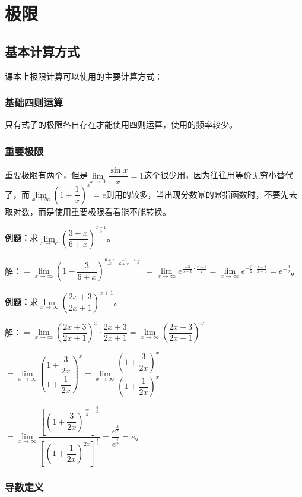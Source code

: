 \chapter{极限}
\section{基本计算方式}

课本上极限计算可以使用的主要计算方式：

\subsection{基础四则运算}

只有式子的极限各自存在才能使用四则运算，使用的频率较少。

\subsection{重要极限}

重要极限有两个，但是$\lim\limits_{x\to 0}\dfrac{\sin x}{x}=1$这个很少用，因为往往用等价无穷小替代了，而$\lim\limits_{x\to\infty}\left(1+\dfrac{1}{x}\right)^x=e$则用的较多，当出现分数幂的幂指函数时，不要先去取对数，而是使用重要极限看看能不能转换。\medskip

\textbf{例题：}求$\lim\limits_{x\to\infty}\left(\dfrac{3+x}{6+x}\right)^{\frac{x-1}{2}}$。\medskip

解：$=\lim\limits_{x\to\infty}\left(1-\dfrac{3}{6+x}\right)^{\frac{6+x}{-3}\cdot\frac{-3}{6+x}\cdot\frac{x-1}{2}}=\lim\limits_{x\to\infty}e^{\frac{-3}{6+x}\cdot\frac{x-1}{2}}=\lim\limits_{x\to\infty}e^{-\frac{3}{2}\cdot\frac{x-1}{x+6}}=e^{-\frac{3}{2}}$。\medskip

\textbf{例题：}求$\lim\limits_{x\to\infty}\left(\dfrac{2x+3}{2x+1}\right)^{x+1}$。\medskip

解：$=\lim\limits_{x\to\infty}\left(\dfrac{2x+3}{2x+1}\right)^x\cdot\dfrac{2x+3}{2x+1}=\lim\limits_{x\to\infty}\left(\dfrac{2x+3}{2x+1}\right)^x$\medskip

$=\lim\limits_{x\to\infty}\left(\dfrac{1+\dfrac{3}{2x}}{1+\dfrac{1}{2x}}\right)^x=\lim\limits_{x\to\infty}\dfrac{\left(1+\dfrac{3}{2x}\right)^x}{\left(1+\dfrac{1}{2x}\right)^x}$

$=\lim\limits_{x\to\infty}\dfrac{\left[\left(1+\dfrac{3}{2x}\right)^{\frac{2x}{3}}\right]^{\frac{3}{2}}}{\left[\left(1+\dfrac{1}{2x}\right)^{2x}\right]^{\frac{1}{2}}}=\dfrac{e^{\frac{3}{2}}}{e^{\frac{1}{2}}}=e$。

\subsection{导数定义}

